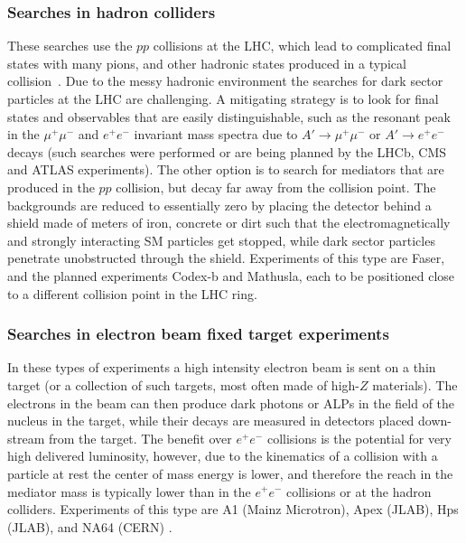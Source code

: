 \subsubsection{Searches in hadron colliders} 
These searches use the $pp$ collisions at the LHC, which lead to complicated final states with many pions, and other hadronic states produced in a typical collision~\cite{dark:sector:LHC}. Due to the messy hadronic environment the searches for dark sector particles at the LHC are challenging. 
A mitigating strategy is to look for final states and observables that are easily distinguishable, such as the resonant peak  in the $\mu^+\mu^-$ and $e^+e^-$ invariant mass spectra due to  $A'\to \mu^+\mu^-$ or $A'\to e^+e^-$ decays (such searches were performed or are being planned by the LHCb, CMS and ATLAS experiments). The other option is to search for mediators that are produced in the $pp$ collision, but decay far away from the collision point. The backgrounds are reduced to essentially zero by placing the detector behind a shield made of meters of iron, concrete or dirt such that the electromagnetically and strongly interacting SM particles get stopped, while dark sector particles penetrate unobstructed through the shield.  Experiments of this type are {\sc Faser}, and the planned experiments {\sc Codex-b} and {\sc Mathusla}, each to be positioned close to a different collision point in the LHC ring. 

\subsubsection{Searches in electron beam fixed target experiments} 
In these types of experiments a high intensity electron beam is sent on a thin target (or a collection of such targets, most often made of high-$Z$ materials). The electrons in the beam can then produce dark photons or ALPs in the field of the nucleus in the target, while their decays are measured in detectors placed down-stream from the target. The benefit over $e^+e^-$ collisions is the potential for very high delivered luminosity, however,
due to the kinematics of a collision with a particle at rest the center of mass energy is lower, and therefore
 the reach in the mediator mass is typically lower than in the $e^+e^-$ collisions or at the hadron colliders. 
 Experiments of this type are A1 (Mainz Microtron), {\sc Apex} (JLAB), {\sc Hps} (JLAB), and NA64 (CERN) \cite{electron:beam:fixed:target}.

